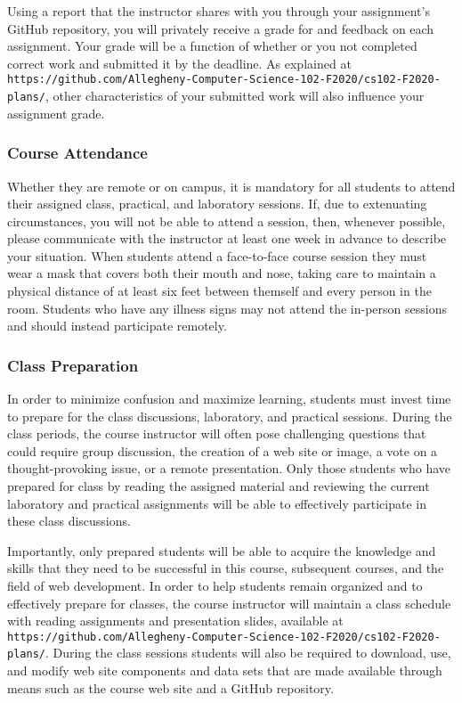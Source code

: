 \documentclass[11pt]{article}
\newcommand{\url}[1]{\lstinline{#1}}
\begin{document}
Using a report that the instructor shares with you through your assignment's
GitHub repository, you will privately receive a grade for and feedback on each
assignment. Your grade will be a function of whether or you not completed
correct work and submitted it by the deadline. As explained at
\url{https://github.com/Allegheny-Computer-Science-102-F2020/cs102-F2020-plans/},
other characteristics of your submitted work will also influence your assignment
grade.

\vspace*{-.05in}

\subsubsection*{Course Attendance}

Whether they are remote or on campus, it is mandatory for all students to attend
their assigned class, practical, and laboratory sessions. If, due to extenuating
circumstances, you will not be able to attend a session, then, whenever
possible, please communicate with the instructor at least one week in advance to
describe your situation. When students attend a face-to-face course session they
must wear a mask that covers both their mouth and nose, taking care to maintain
a physical distance of at least six feet between themself and every person in
the room. Students who have any illness signs may not attend the in-person
sessions and should instead participate remotely.

\vspace*{-.05in}

\subsubsection*{Class Preparation}

In order to minimize confusion and maximize learning, students must invest time
to prepare for the class discussions, laboratory, and practical sessions. During
the class periods, the course instructor will often pose challenging questions
that could require group discussion, the creation of a web site or image, a vote
on a thought-provoking issue, or a remote presentation. Only those students who
have prepared for class by reading the assigned material and reviewing the
current laboratory and practical assignments will be able to effectively
participate in these class discussions.

Importantly, only prepared students will be able to acquire the knowledge and
skills that they need to be successful in this course, subsequent courses, and
the field of web development. In order to help students remain organized and to
effectively prepare for classes, the course instructor will maintain a class
schedule with reading assignments and presentation slides, available at
\url{https://github.com/Allegheny-Computer-Science-102-F2020/cs102-F2020-plans/}.
During the class sessions students will also be required to download, use, and
modify web site components and data sets that are made available through means
such as the course web site and a GitHub repository.
\end{document}

